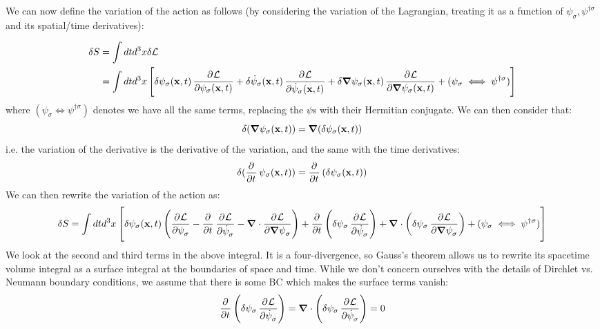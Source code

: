 We can now define the variation of the action as follows (by considering the variation of the Lagrangian, treating it as a function of $\psi_\sigma, \psi^{\dag\sigma}$ and its spatial/time derivatives):

\begin{equation}
    \begin{split}
        \delta S &= \int dt d^3 x \delta \L
        \\ &=\int dt d^3x \left[ \delta \psi_\sigma(\v{x}, t) \dpd{\L}{\psi_\sigma(\v{x}, t)} + \delta \dot{\psi}_\sigma(\v{x}, t) \dpd{\L}{\dot{\psi}_\sigma(\v{x}, t)} + \delta \nabla \psi_\sigma(\v{x}, t)\dpd{\L}{\nabla \psi_\sigma(\v{x}, t)} + (\psi_\sigma \iff \psi^{\dag\sigma})\right]
    \end{split}
\end{equation}
where $(\psi_\sigma \iff \psi^{\dag\sigma})$ denotes we have all the same terms, replacing the $\psi$s with their Hermitian conjugate. We can then consider that:
\begin{equation}
    \delta(\nabla \psi_\sigma(\v{x}, t)) = \nabla(\delta \psi_\sigma(\v{x}, t))
\end{equation}
i.e. the variation of the derivative is the derivative of the variation, and the same with the time derivatives:
\begin{equation}
    \delta(\dpd{}{t}\psi_\sigma(\v{x}, t)) = \dpd{}{t}(\delta\psi_\sigma(\v{x}, t))
\end{equation}
We can then rewrite the variation of the action as:
\begin{equation}
    \delta S = \int dtd^3x \left[\delta \psi_\sigma(\v{x}, t)\left(\dpd{\L}{\psi_\sigma} - \dpd{}{t}\dpd{\L}{\dot{\psi}_\sigma} - \nabla \cdot \dpd{\L}{\nabla \psi_\sigma}\right) + \dpd{}{t}\left(\delta \psi_\sigma\dpd{\L}{\dot{\psi}_\sigma}\right) + \nabla \cdot \left(\delta \psi_\sigma\dpd{\L}{\nabla \psi_\sigma}\right) + (\psi_\sigma \iff \psi^{\dag\sigma})\right]
\end{equation}
We look at the second and third terms in the above integral. It is a four-divergence, so Gauss’s theorem allows us to rewrite its spacetime volume integral as a surface integral at the boundaries of space and time.
While we don't concern ourselves with the details of Dirchlet vs. Neumann boundary conditions, we assume that there is some BC which makes the surface terms vanish:
\begin{equation}
    \dpd{}{t}\left(\delta \psi_\sigma\dpd{\L}{\dot{\psi}_\sigma}\right) = \nabla \cdot \left(\delta \psi_\sigma\dpd{\L}{\dot{\psi}_\sigma}\right) = 0
\end{equation}

